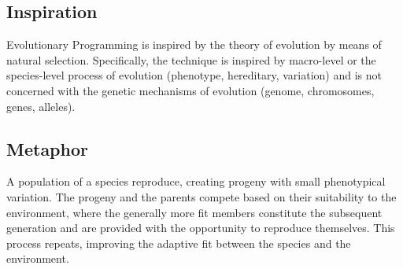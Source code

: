 \subsection{Inspiration}
Evolutionary Programming is inspired by the theory of evolution by means of natural selection.
Specifically, the technique is inspired by macro-level or the species-level process of evolution (phenotype, hereditary, variation) and is not concerned with the genetic mechanisms of evolution (genome, chromosomes, genes, alleles).

\subsection{Metaphor}
A population of a species reproduce, creating progeny with small phenotypical variation. The progeny and the parents compete based on their suitability to the environment, where the generally more fit members constitute the subsequent generation and are provided with the opportunity to reproduce themselves. This process repeats, improving the adaptive fit between the species and the environment.

